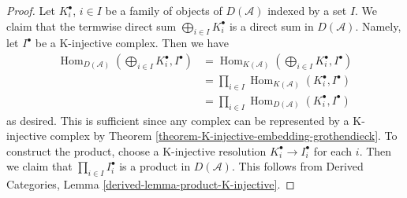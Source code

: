 \documentclass[10pt,a4paper]{amsart}
\theoremstyle{plain}
\theoremstyle{definition}
\theoremstyle{remark}
\numberwithin{equation}{subsection}
\def\Hom{\mathop{\mathrm{Hom}}\nolimits}
\begin{document}
\begin{proof}
Let $K^\bullet_i$, $i \in I$ be a family of objects of $D(\mathcal{A})$
indexed by a set $I$. We claim that the termwise direct sum
$\bigoplus_{i \in I} K^\bullet_i$ is a direct sum in $D(\mathcal{A})$.
Namely, let $I^\bullet$ be a K-injective complex. Then we have
\begin{align*}
\Hom_{D(\mathcal{A})}(\bigoplus\nolimits_{i \in I} K^\bullet_i, I^\bullet)
& =
\Hom_{K(\mathcal{A})}(\bigoplus\nolimits_{i \in I} K^\bullet_i, I^\bullet) \\
& =
\prod\nolimits_{i \in I} \Hom_{K(\mathcal{A})}(K^\bullet_i, I^\bullet) \\
& =
\prod\nolimits_{i \in I} \Hom_{D(\mathcal{A})}(K^\bullet_i, I^\bullet)
\end{align*}
as desired. This is sufficient since any complex can be represented
by a K-injective complex by
Theorem \ref{theorem-K-injective-embedding-grothendieck}.
To construct the product, choose a K-injective resolution
$K_i^\bullet \to I_i^\bullet$ for each $i$. Then we claim that
$\prod_{i \in I} I_i^\bullet$ is a product in $D(\mathcal{A})$.
This follows from
Derived Categories, Lemma \ref{derived-lemma-product-K-injective}.
\end{proof}
\end{document}
